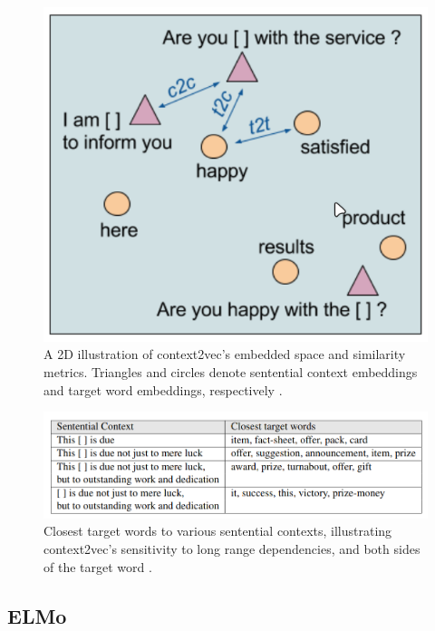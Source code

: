             \begin{figure}[htb]
                \centering
                \includegraphics[scale = 0.35]{Sections/3StateOfTheArt/3_images/context2vec_embedding.png}
                \caption{A 2D illustration of context2vec’s embedded space and similarity metrics. Triangles and circles denote sentential context embeddings and target word embeddings, respectively \cite{Melamud2016}.} 
            \end{figure}

            \begin{figure}[htb]
                \centering
                \includegraphics[scale = 0.35]{Sections/3StateOfTheArt/3_images/context2vec_predict.png}
                \caption{Closest target words to various sentential contexts, illustrating context2vec’s sensitivity to long range dependencies, and both sides of the target word \cite{Melamud2016}.} 
            \end{figure}
            
        \newpage


        \subsection{ELMo}

